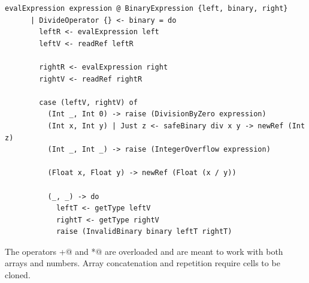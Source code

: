 \documentclass[UdineBachThesis,american,11pt]{PhdThesis}
\begin{document}
  \begin{lstlisting}[gobble=4,basicstyle=\ttfamily\small]
    evalExpression expression @ BinaryExpression {left, binary, right}
      | DivideOperator {} <- binary = do
        leftR <- evalExpression left
        leftV <- readRef leftR

        rightR <- evalExpression right
        rightV <- readRef rightR

        case (leftV, rightV) of
          (Int _, Int 0) -> raise (DivisionByZero expression)
          (Int x, Int y) | Just z <- safeBinary div x y -> newRef (Int z)
          (Int _, Int _) -> raise (IntegerOverflow expression)

          (Float x, Float y) -> newRef (Float (x / y))

          (_, _) -> do
            leftT <- getType leftV
            rightT <- getType rightV
            raise (InvalidBinary binary leftT rightT)
  \end{lstlisting}

  The operators \lstinline@+@ and \lstinline@*@ are overloaded and are meant to
  work with both arrays and numbers. Array concatenation and repetition require
  cells to be cloned.
\end{document}
